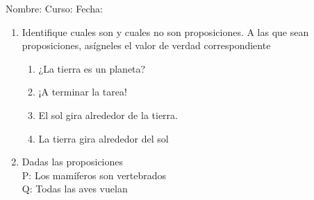 \documentclass[letterpaper,fleqn]{article}
\newcommand{\LineaNombre}{%
\par
\vspace{\baselineskip}
Nombre:\hrulefill \; Curso: \underline{\hspace*{48pt}} \; Fecha: \underline{\hspace*{2.5cm}} \relax
\par}
\begin{document}
\LineaNombre
\begin{enumerate}
 \item Identifique cuales son y cuales no son proposiciones. A las que sean proposiciones, as\'{i}gneles el valor de verdad correspondiente
 \begin{enumerate}
 \item ¿La tierra es un planeta?
 \item ¡A terminar la tarea!
 \item El sol gira alrededor de la tierra.
  \item La tierra gira alrededor del sol
 \end{enumerate}
 \item Dadas las proposiciones\\
 P: Los mamíferos son vertebrados\\
 Q: Todas las aves vuelan\\
 

\end{enumerate}
\end{document}
